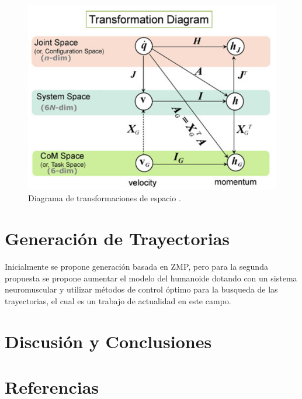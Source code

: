 \documentclass[journal,letterpaper,twoside,twocolumn]{IEEEtran}
\newcommand{\myreferences}{../../doc/review/review/library}
\begin{document}
\begin{figure}[!t]
  \centering
  \includegraphics[scale=0.3]{Orin2013TransformationDiagram.png}
  \caption{Diagrama de transformaciones de espacio \protect\cite{Orin2013}.}
  \label{fig:diagTransf}
\end{figure}

\section{Generación de Trayectorias}
\label{sec:genTray}
Inicialmente se propone generación basada en ZMP\cite{Chen2011,Or2010}, pero para la segunda propuesta se propone aumentar el modelo del humanoide dotando con un sistema neuromuscular y utilizar métodos de control óptimo para la busqueda de las trayectorias, el cual es un trabajo de actualidad en este campo\cite{Peng2017}. 

\section{Discusión y Conclusiones}
\label{sec:conclu}

\section{Referencias}
\label{sec:refs}

\end{document}
